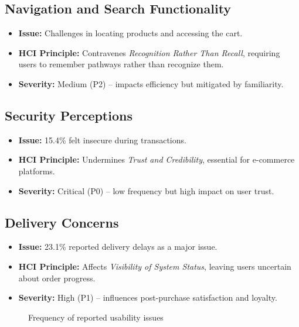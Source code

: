 \documentclass[conference]{IEEEtran}
\begin{document}
\subsection{Navigation and Search Functionality}
\begin{itemize}
    \item \textbf{Issue:} Challenges in locating products and accessing the cart.
    \item \textbf{HCI Principle:} Contravenes \textit{Recognition Rather Than Recall}, requiring users to remember pathways rather than recognize them.
    \item \textbf{Severity:} Medium (P2) – impacts efficiency but mitigated by familiarity.
\end{itemize}

\subsection{Security Perceptions}
\begin{itemize}
    \item \textbf{Issue:} 15.4\% felt insecure during transactions.
    \item \textbf{HCI Principle:} Undermines \textit{Trust and Credibility}, essential for e-commerce platforms.
    \item \textbf{Severity:} Critical (P0) – low frequency but high impact on user trust.
\end{itemize}

\subsection{Delivery Concerns}
\begin{itemize}
    \item \textbf{Issue:} 23.1\% reported delivery delays as a major issue.
    \item \textbf{HCI Principle:} Affects \textit{Visibility of System Status}, leaving users uncertain about order progress.
    \item \textbf{Severity:} High (P1) – influences post-purchase satisfaction and loyalty.
\end{itemize}

\begin{figure}[!htbp]
\centering
{}
\caption{Frequency of reported usability issues}
\label{fig:usability_issues}
\end{figure}
\end{document}
